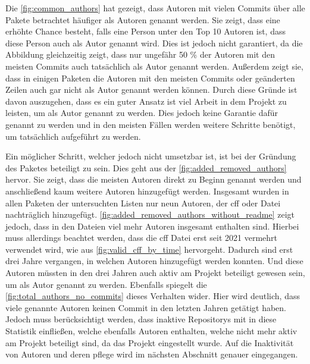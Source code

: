 Die \autoref{fig:common_authors} hat gezeigt, dass Autoren mit vielen Commits über alle Pakete betrachtet häufiger als Autoren genannt werden.
Sie zeigt, dass eine erhöhte Chance besteht, falls eine Person unter den Top 10 Autoren ist, dass diese Person auch als Autor genannt wird.
Dies ist jedoch nicht garantiert, da die Abbildung gleichzeitig zeigt, dass nur ungefähr 50 \% der Autoren mit den meisten Commits auch tatsächlich als Autor genannt werden.
Außerdem zeigt sie, dass in einigen Paketen die Autoren mit den meisten Commits oder geänderten Zeilen auch gar nicht als Autor genannt werden können.
Durch diese Gründe ist davon auszugehen, dass es ein guter Ansatz ist viel Arbeit in dem Projekt zu leisten, um als Autor genannt zu werden.
Dies jedoch keine Garantie dafür genannt zu werden und in den meisten Fällen werden weitere Schritte benötigt, um tatsächlich aufgeführt zu werden.

Ein möglicher Schritt, welcher jedoch nicht umsetzbar ist, ist bei der Gründung des Paketes beteiligt zu sein.
Dies geht aus der \autoref{fig:added_removed_authors} hervor.
Sie zeigt, dass die meisten Autoren direkt zu Beginn genannt werden und anschließend kaum weitere Autoren hinzugefügt werden.
Insgesamt wurden in allen Paketen der untersuchten Listen nur neun Autoren, der \gls{cff} oder  Datei nachträglich hinzugefügt.
\autoref{fig:added_removed_authors_without_readme} zeigt jedoch, dass in den Dateien viel mehr Autoren insgesamt enthalten sind.
Hierbei muss allerdings beachtet werden, dass die \gls{cff} Datei erst seit 2021 vermehrt verwendet wird, wie aus \autoref{fig:valid_cff_by_time} hervorgeht.
Dadurch sind erst drei Jahre vergangen, in welchen Autoren hinzugefügt werden konnten.
Und diese Autoren müssten in den drei Jahren auch aktiv am Projekt beteiligt gewesen sein, um als Autor genannt zu werden.
Ebenfalls spiegelt die \autoref{fig:total_authors_no_commits} dieses Verhalten wider.
Hier wird deutlich, dass viele genannte Autoren keinen Commit in den letzten Jahren getätigt haben.
Jedoch muss berücksichtigt werden, dass inaktive Repositorys mit in diese Statistik einfließen, welche ebenfalls Autoren enthalten, welche nicht mehr aktiv am Projekt beteiligt sind, da das Projekt eingestellt wurde.
Auf die Inaktivität von Autoren und deren pflege wird im nächsten Abschnitt genauer eingegangen.

